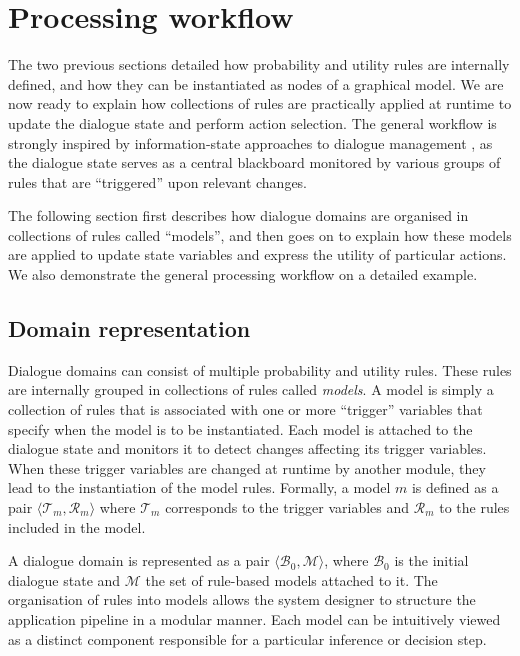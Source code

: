
%

\section{Processing workflow}
\label{sec:processing-workflow}

The two previous sections detailed how probability and utility rules are internally defined, and how they can be instantiated as nodes of a graphical model. We are now ready to explain how collections of rules are practically applied at runtime to update the dialogue state and perform action selection. The general workflow is strongly inspired by information-state approaches to dialogue management \citep{Larsson:2000}, as the dialogue state serves as a central blackboard monitored by various groups of rules that are ``triggered'' upon relevant changes. 

The following section first describes how dialogue domains are organised in collections of rules called ``models'', and then goes on to explain how these models are applied to update state variables and express the utility of particular actions. We also demonstrate the general processing workflow on a detailed example. 


\subsection{Domain representation}

Dialogue domains can consist of multiple probability and utility rules. These rules are internally grouped in collections of rules called \textit{models}. A model is simply a collection of rules that is associated with one or more ``trigger'' variables that specify when the model is to be instantiated. Each model is attached to the dialogue state and monitors it to detect changes affecting its trigger variables. When these trigger variables are changed at runtime by another module, they lead to the instantiation of the model rules. Formally, a model $m$ is defined as a pair $\langle \mathcal{T}_m, \mathcal{R}_m \rangle$ where $\mathcal{T}_m$ corresponds to the trigger variables and $\mathcal{R}_m$ to the rules included in the model.

A dialogue domain is represented as a pair $\langle \mathcal{B}_0, \mathcal{M} \rangle$, where $\mathcal{B}_0$ is the initial dialogue state  and $\mathcal{M}$ the set of rule-based models attached to it. The organisation of rules into models allows the system designer to structure the application pipeline in a modular manner. Each model can be intuitively viewed as a distinct component responsible for a particular inference or decision step. 

